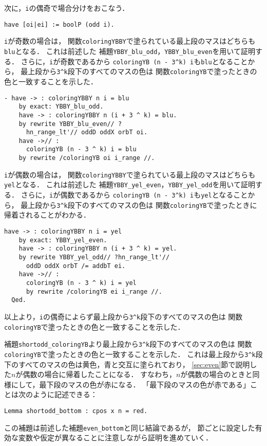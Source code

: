 次に，{\tt{i}}の偶奇で場合分けをおこなう．
\begin{lstlisting}[language=Coq]
  have [oi|ei] := boolP (odd i).
\end{lstlisting}
{\tt{i}}が奇数の場合は，
関数{\tt{coloringYBBY}}で塗られている最上段のマスはどちらも{\tt{blu}}となる．
これは前述した
補題{\tt{YBBY\_blu\_odd}}，{\tt{YBBY\_blu\_even}}を用いて証明する．
さらに，{\tt{i}}が奇数であるから
{\tt{coloringYB (n - 3\verb|^|k) i}}も{\tt{blu}}となることから，
最上段から{\tt{3\verb|^|k}}段下のすべてのマスの色は
関数{\tt{coloringYB}}で塗ったときの色と一致することを示した．
\begin{lstlisting}[language=Coq]
  - have -> : coloringYBBY n i = blu
    by exact: YBBY_blu_odd.
    have -> : coloringYBBY n (i + 3 ^ k) = blu.
    by rewrite YBBY_blu_even// ?
      hn_range_lt'// oddD oddX orbT oi.
    have ->// :
      coloringYB (n - 3 ^ k) i = blu
    by rewrite /coloringYB oi i_range //.
\end{lstlisting}
{\tt{i}}が偶数の場合は，
関数{\tt{coloringYBBY}}で塗られている最上段のマスはどちらも{\tt{yel}}となる．
これは前述した
補題{\tt{YBBY\_yel\_even}}，{\tt{YBBY\_yel\_odd}}を用いて証明する．
さらに，{\tt{i}}が偶数であるから
{\tt{coloringYB (n - 3\verb|^|k) i}}も{\tt{yel}}となることから，
最上段から{\tt{3\verb|^|k}}段下のすべてのマスの色は
関数{\tt{coloringYB}}で塗ったときに帰着されることがわかる．
\begin{lstlisting}[language=Coq]
    have -> : coloringYBBY n i = yel
    by exact: YBBY_yel_even.      
    have -> : coloringYBBY n (i + 3 ^ k) = yel.
    by rewrite YBBY_yel_odd// ?hn_range_lt'//
      oddD oddX orbT /= addbT ei.
    have ->// :
      coloringYB (n - 3 ^ k) i = yel
      by rewrite /coloringYB ei i_range //.
  Qed.
\end{lstlisting}
以上より，{\tt{i}}の偶奇によらず最上段から{\tt{3\verb|^|k}}段下のすべてのマスの色は
関数{\tt{coloringYB}}で塗ったときの色と一致することを示した．

補題{\tt{shortodd\_coloringYB}}より最上段から{\tt{3\verb|^|k}}段下のすべてのマスの色は
関数{\tt{coloringYB}}で塗ったときの色と一致することを示した．
これは最上段から{\tt{3\verb|^|k}}段下のすべてのマスの色は黄色，青と交互に塗られており，
\ref{sec:even}節で説明した$n$が偶数の場合に帰着したことになる．
すなわち，$n$が偶数の場合のときと同様にして，最下段のマスの色が赤になる．
「最下段のマスの色が赤である」ことは次のように記述できる：
\begin{lstlisting}[language=Coq]
  Lemma shortodd_bottom : cpos x n = red.
\end{lstlisting}
この補題は前述した補題{\tt{even\_bottom}}と同じ結論であるが，
節ごとに設定した有効な変数や仮定が異なることに注意しながら証明を進めていく．

